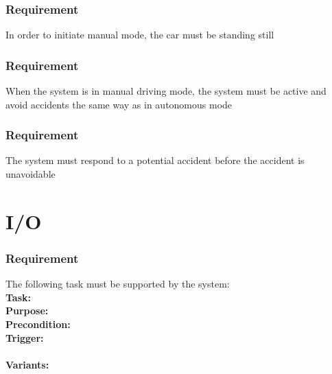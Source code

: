 \documentclass{article}
\begin{document}
{      \subsubsection{Requirement}
\hfill \break 
\- \- \-In order to initiate manual mode, the car must be standing still
      \subsubsection{Requirement}
\hfill \break 
\- \- \-When the system is in manual driving mode, the system must be active and avoid accidents the same way as in autonomous mode
      \subsubsection{Requirement}
\hfill \break 
\- \- \-The system must respond to a potential accident before the accident is unavoidable

\section{I/O}
\subsubsection {Requirement}
\hfill \break 
\- \- \-The following task must be supported by the system:\\
\hfill \break 
\textbf{Task:} \\
\textbf{Purpose:} \\
\textbf{Precondition:} \\
\textbf{Trigger:} \\
\\
\textbf{Variants:}  \\
\tab{ } \tab{ } \\
\tab{ }  \\ \tab{ } \tab{ } \\
\tab{ }  \\
\tab{ } \tab{ } \\
\tab{ }  
\bigskip


}
\end{document}

